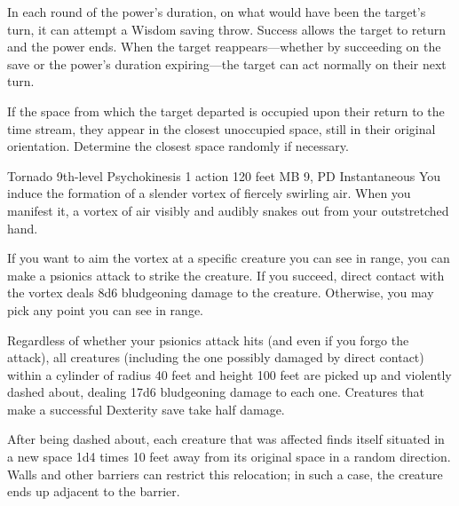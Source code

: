   In each round of the power's duration,
  on what would have been the target's turn,
  it can attempt a Wisdom saving throw.
  Success allows the target to return and the power ends.
  When the target reappears---whether by succeeding on the save
  or the power's duration expiring---the target
  can act normally on their next turn.
  
  If the space from which the target departed is occupied
  upon their return to the time stream,
  they appear in the closest unoccupied space,
  still in their original orientation.
  Determine the closest space randomly if necessary.

\DndPowerHeader%
  {Tornado}
  {9th-level Psychokinesis}
  {1 action}
  {120 feet}
  {MB 9, PD \lvlnine}
  {Instantaneous}
  You induce the formation of a slender vortex
  of fiercely swirling air.
  When you manifest it,
  a vortex of air visibly and audibly snakes out from your
  outstretched hand.

  If you want to aim the vortex at a specific creature
  you can see in range,
  you can make a psionics attack to strike the creature.
  If you succeed,
  direct contact with the vortex deals 8d6 bludgeoning damage
  to the creature.
  Otherwise,
  you may pick any point you can see in range.
  
  Regardless of whether your psionics attack hits
  (and even if you forgo the attack),
  all creatures
  (including the one possibly damaged by direct contact)
  within a cylinder of radius 40 feet
  and height 100 feet
  are picked up and violently dashed about,
  dealing 17d6 bludgeoning damage to each one.
  Creatures that make a successful Dexterity save
  take half damage.
  
  After being dashed about,
  each creature that was affected finds itself situated
  in a new space 1d4 times 10 feet
  away from its original space in a random direction.
  Walls and other barriers can restrict this relocation;
  in such a case,
  the creature ends up adjacent to the barrier.

